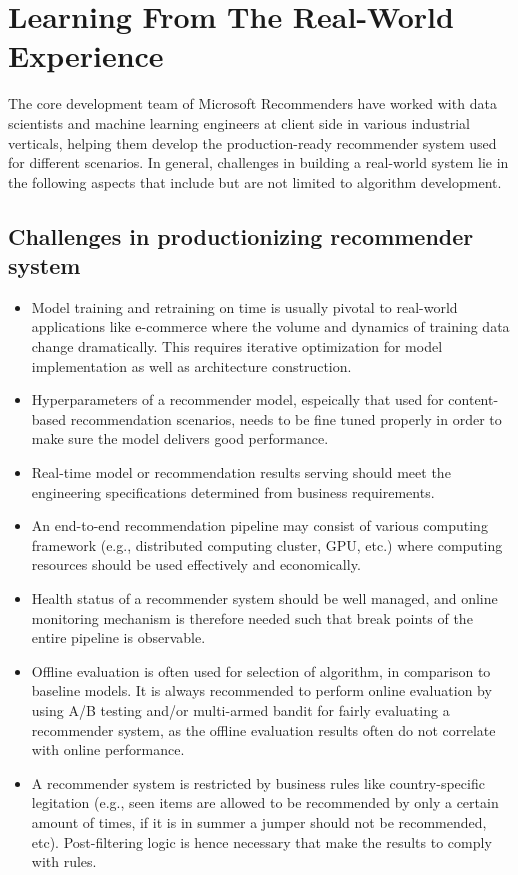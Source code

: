\section{Learning From The Real-World Experience} %
The core development team of Microsoft Recommenders have worked with data scientists and machine learning engineers at client side in various industrial verticals, helping them develop the production-ready recommender system used for different scenarios. In general, challenges in building a real-world system lie in the following aspects that include but are not limited to algorithm development.

\subsection{Challenges in productionizing recommender system}

\begin{itemize}
    \item Model training and retraining on time is usually pivotal to real-world applications like e-commerce where the volume and dynamics of training data change dramatically. This requires iterative optimization for model implementation as well as architecture construction.
    \item Hyperparameters of a recommender model, espeically that used for content-based recommendation scenarios, needs to be fine tuned properly in order to make sure the model delivers good performance. 
    \item Real-time model or recommendation results serving should meet the engineering specifications determined from business requirements. 
    \item An end-to-end recommendation pipeline may consist of various computing framework (e.g., distributed computing cluster, GPU, etc.) where computing resources should be used effectively and economically. 
    \item Health status of a recommender system should be well managed, and online monitoring mechanism is therefore needed such that break points of the entire pipeline is observable.
    \item Offline evaluation is often used for selection of algorithm, in comparison to baseline models. It is always recommended to perform online evaluation by using A/B testing and/or multi-armed bandit for fairly evaluating a recommender system, as the offline evaluation results often do not correlate with online performance.
    \item A recommender system is restricted by business rules like country-specific legitation (e.g., seen items are allowed to be recommended by only a certain amount of times, if it is in summer a jumper should not be recommended, etc). Post-filtering logic is hence necessary that make the results to comply with rules.
\end{itemize}

